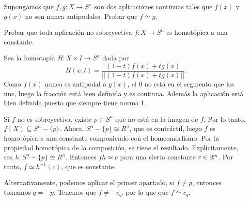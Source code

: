 \documentclass[twoside]{article}
\begin{document}
\begin{ejercicio}{6.4}
Supongamos que $f,g:X\to S^n$ son dos aplicaciones continuas tales que $f(x)$ y $g(x)$ no son nunca antipodales. Probar que $f\simeq g$. 

Probar que toda aplicación no sobreyectiva $f:X\to S^n$ es homotópica a una constante.
\end{ejercicio}
\begin{solucion}
Sea la homotopía $H:X\times I\to S^n$ dada por
\[
H(x,t)=\frac{(1-t)f(x)+tg(x)}{||(1-t)f(x)+tg(x)||}.
\]
Como $f(x)$ nunca es antipodal a $g(x)$, el 0 no está en el segmento que los une, luego la fracción está bien definida y es continua. Además la aplicación está bien definida puesto que siempre tiene norma 1. 

Si $f$ no es sobreyectiva, existe $p\in S^n$ que no está en la imagen de $f$. Por lo tanto. $f(X)\subseteq S^n-\{p\}$. Ahora, $S^n-\{p\}\cong R^n$, que es contráctil, luego $f$ es homotópica a una constante componiendo con el homeomorfismo. Por la propiedad homotópica de la composición, se tiene el resultado. Explícitamente, sea $h:S^n-\{p\}\cong R^n$. Entonces $fh\simeq c$ para una cierta constante $c\in\mathbb{R}^n$. Por tanto, $f\simeq h^{-1}(c)$, que es constante.

Alternativamente, podemos aplicar el primer apartado, si $f\neq p$, entonces tomamos $q=-p$. Tenemos que $f\neq -c_q$, por lo que que $f\simeq c_q$.
\end{solucion}

\newpage
\end{document}
